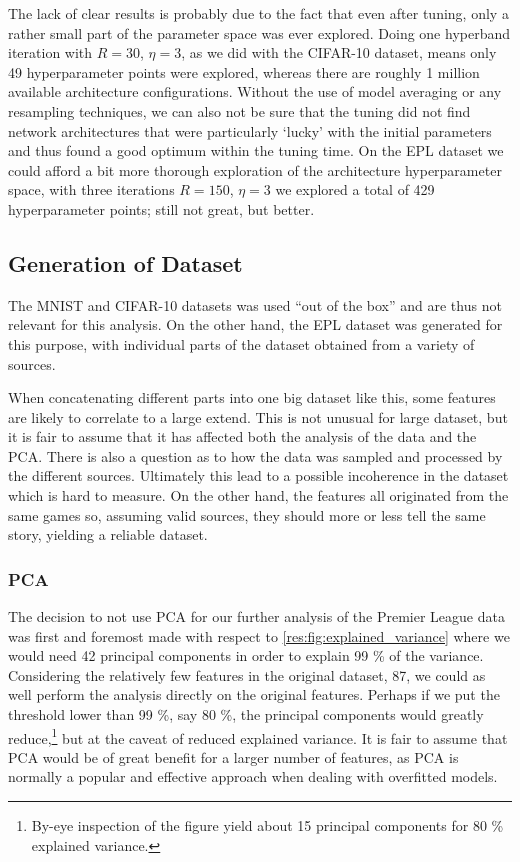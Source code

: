     The lack of clear results is probably due to the fact that even after tuning, only a rather small part of the parameter space was ever explored. Doing one hyperband iteration with $R=30$, $\eta=3$, as we did with the CIFAR-10 dataset, means only 49 hyperparameter points were explored, whereas there are roughly 1 million available architecture configurations. Without the use of model averaging or any resampling techniques, we can also not be sure that the tuning did not find network architectures that were particularly `lucky' with the initial parameters and thus found a good optimum within the tuning time. On the EPL dataset we could afford a bit more thorough exploration of the architecture hyperparameter space, with three iterations $R=150$, $\eta=3$ we explored a total of 429 hyperparameter points; still not great, but better.
    
    \subsection{Generation of Dataset}
        The MNIST and CIFAR-10 datasets was used ``out of the box'' and are thus not relevant for this analysis. On the other hand, the EPL dataset was generated for this purpose, with individual parts of the dataset obtained from a variety of sources.
        
        When concatenating different parts into one big dataset like this, some features are likely to correlate to a large extend. This is not unusual for large dataset, but it is fair to assume that it has affected both the analysis of the data and the PCA. There is also a question as to how the data was sampled and processed by the different sources. Ultimately this lead to a possible incoherence in the dataset which is hard to measure. On the other hand, the features all originated from the same games so, assuming valid sources, they should more or less tell the same story, yielding a reliable dataset. 
    
\subsubsection{PCA}
    The decision to not use PCA for our further analysis of the Premier League data was first and foremost made with respect to \cref{res:fig:explained_variance} where we would need 42 principal components in order to explain 99 \% of the variance. Considering the relatively few features in the original dataset, 87, we could as well perform the analysis directly on the original features. Perhaps if we put the threshold lower than 99 \%, say 80 \%, the principal components would greatly reduce,\footnote{By-eye inspection of the  figure yield about 15 principal components for 80 \% explained variance.} but at the caveat of reduced explained variance. It is fair to assume that PCA would be of great benefit for a larger number of features, as PCA is normally a popular and effective approach when dealing with overfitted models.

